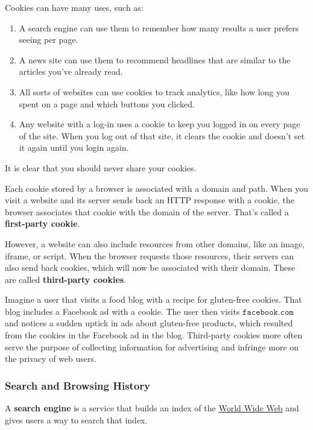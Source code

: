 \documentclass{article}
\newcounter{definition}[section]
\begin{document}
  Cookies can have many uses, such as: 
  \begin{enumerate}
      \item A search engine can use them to remember how many results a user prefers seeing per page.
      \item A news site can use them to recommend headlines that are similar to the articles you've already read. 
      \item All sorts of websites can use cookies to track analytics, like how long you spent on a page and which buttons you clicked.
      \item Any website with a log-in uses a cookie to keep you logged in on every page of the site. When you log out of that site, it clears the cookie and doesn't set it again until you login again.
  \end{enumerate}
  It is clear that you should never share your cookies. 

  \begin{definition}
    \label{def:first-party-and-third-party-cookies}
  Each cookie stored by a browser is associated with a domain and path. When you visit a website and its server sends back an HTTP response with a cookie, the browser associates that cookie with the domain of the server. That's called a \textbf{first-party cookie}. 

  However, a website can also include resources from other domains, like an image, iframe, or script. When the browser requests those resources, their servers can also send back cookies, which will now be associated with their domain. These are called \textbf{third-party cookies}.
  \end{definition}

  Imagine a user that visits a food blog with a recipe for gluten-free cookies. That blog includes a Facebook ad with a cookie. The user then visits $\texttt{facebook.com}$ and notices a sudden uptick in ads about gluten-free products, which resulted from the cookies in the Facebook ad in the blog. Third-party cookies more often serve the purpose of collecting information for advertising and infringe more on the privacy of web users. 

  \subsubsection{Search and Browsing History}
  \begin{definition}
    \label{def:search-engine}
  A \textbf{search engine} is a service that builds an index of the \hyperref[def:world-wide-web]{World Wide Web} and gives users a way to search that index. 
  \end{definition}
\end{document}
